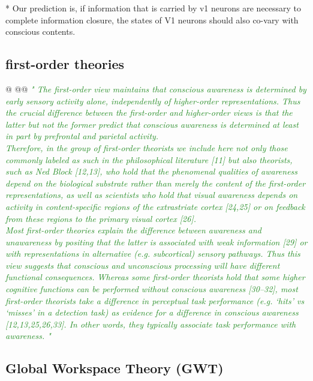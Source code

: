 \documentclass[utf8]{article}
\newenvironment{ants}
			{
			 \begin{easylist}[itemize]
			}
			{
			\end{easylist}
			}
\newcommand{\rewrite}[1]{\textcolor{ForestGreen}{\textit{"#1"}}\newline}
\begin{document}
				* Our prediction is, if information that is carried by v1 neurons are necessary to complete information closure, the states of V1 neurons should also co-vary with conscious contents. 	
				
		\subsection{first-order theories}
			\begin{ants}
				@\cite{lau2011empirical}
					@@ \rewrite{
						The ﬁrst-order view maintains that conscious awareness is determined by early sensory activity alone, independently of higher-order representations. Thus the crucial difference between the ﬁrst-order and higher-order views is that the latter but not the former predict that conscious awareness is determined at least in part by prefrontal and parietal activity.\\
						Therefore, in the group of ﬁrst-order theorists we include here not only those commonly labeled as such in the philosophical literature [11] but also theorists, such as Ned Block [12,13], who hold that the phenomenal qualities of awareness depend on the biological substrate rather than merely the content of the ﬁrst-order representations, as well as scientists who hold that visual awareness depends on activity in content-speciﬁc regions of the extrastriate cortex [24,25] or on feedback from these regions to the primary visual cortex [26].\\
						Most ﬁrst-order theories explain the difference between awareness and unawareness by positing that the latter is associated with weak information [29] or with representations in alternative (e.g. subcortical) sensory pathways. Thus this view suggests that conscious and unconscious processing will have different functional consequences. Whereas some ﬁrst-order theorists hold that some higher cognitive functions can be performed without conscious awareness [30–32], most ﬁrst-order theorists take a difference in perceptual task performance (e.g. ‘hits’ vs ‘misses’ in a detection task) as evidence for a difference in conscious awareness [12,13,25,26,33]. In other words, they typically associate task performance with awareness.
					}
				
			\end{ants}
		
		
		\subsection{Global Workspace Theory (GWT)}
\end{document}
